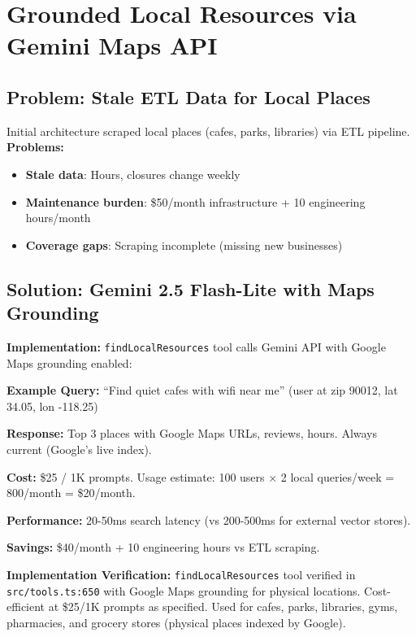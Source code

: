 \documentclass{article}
\begin{document}
\section{Grounded Local Resources via Gemini Maps API}%
\label{sec:GroundedLocalResourcesviaGeminiMapsAPI}%
%
\subsection{Problem: Stale ETL Data for Local Places}%
\label{subsec:ProblemStaleETLDataforLocalPlaces}%
Initial architecture scraped local places (cafes, parks, libraries) via ETL pipeline. \textbf{Problems:}
\begin{itemize}
    \item \textbf{Stale data}: Hours, closures change weekly
    \item \textbf{Maintenance burden}: \$50/month infrastructure + 10 engineering hours/month
    \item \textbf{Coverage gaps}: Scraping incomplete (missing new businesses)
\end{itemize}

%
\subsection{Solution: Gemini 2.5 Flash{-}Lite with Maps Grounding}%
\label{subsec:SolutionGemini2.5Flash{-}LitewithMapsGrounding}%
\textbf{Implementation:} \texttt{findLocalResources} tool calls Gemini API with Google Maps grounding enabled:

\textbf{Example Query:} ``Find quiet cafes with wifi near me'' (user at zip 90012, lat 34.05, lon -118.25)

\textbf{Response:} Top 3 places with Google Maps URLs, reviews, hours. Always current (Google's live index).

\textbf{Cost:} \$25 / 1K prompts. Usage estimate: 100 users $\times$ 2 local queries/week = 800/month = \$20/month.

\textbf{Performance:} 20-50ms search latency (vs 200-500ms for external vector stores).

\textbf{Savings:} \$40/month + 10 engineering hours vs ETL scraping.

\textbf{Implementation Verification:} \texttt{findLocalResources} tool verified in \texttt{src/tools.ts:650} with Google Maps grounding for physical locations. Cost-efficient at \$25/1K prompts as specified. Used for cafes, parks, libraries, gyms, pharmacies, and grocery stores (physical places indexed by Google).
\end{document}
